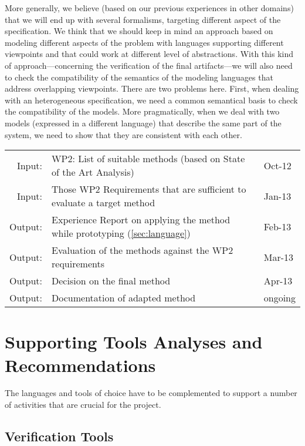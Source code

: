 \documentclass[11pt, a4paper]{article}
\newenvironment{inoutput}
{\vspace{2mm}
\noindent
\begin{tabular}{|r|p{.7\linewidth}|l|}
\hline}
{
\hline
\end{tabular}}
\begin{document}
More generally, we believe (based on our previous experiences in other
domains) that we will end up with several formalisms, targeting
different aspect of the specification. We think that we should keep in
mind an approach based on modeling different aspects of the problem
with languages supporting different viewpoints and that could work at
different level of abstractions. With this kind of
approach---concerning the verification of the final artifacts---we
will also need to check the compatibility of the semantics of the
modeling languages that address overlapping viewpoints. There are two
problems here. First, when dealing with an heterogeneous
specification, we need a common semantical basis to check the
compatibility of the models. More pragmatically, when we deal with two
models (expressed in a different language) that describe the same part
of the system, we need to show that they are consistent with each
other.


\begin{inoutput}
Input: & WP2: List of suitable methods (based on State of the Art Analysis) & Oct-12 \\
Input: & Those WP2 Requirements that are sufficient to evaluate a target method & Jan-13 \\
\hline
Output: & Experience Report on applying the method while prototyping (\ref{sec:language}) & Feb-13 \\
Output: & Evaluation of the methods against the WP2 requirements & Mar-13 \\
Output: & Decision on the final method & Apr-13 \\
Output: & Documentation of adapted method & ongoing \\
\end{inoutput}

\section{Supporting Tools Analyses and Recommendations}
\label{sec:supporting_tools}

The languages and tools of choice have to be complemented to support a number of activities that are crucial for the project.

\subsection{Verification Tools}
\end{document}
